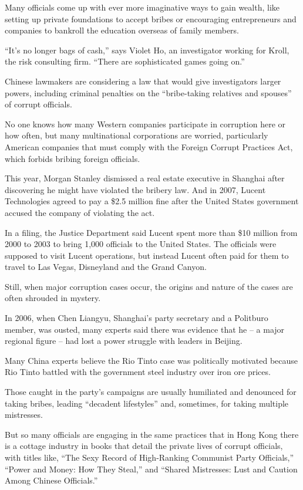 ﻿\documentclass[12pt]{article}
\begin{document}
Many officials come up with ever more imaginative ways to gain wealth, like setting up private
foundations to accept bribes or encouraging entrepreneurs and companies to bankroll the education
overseas of family members.

``It's no longer bags of cash,'' says Violet Ho, an investigator working for Kroll, the risk
consulting firm. ``There are sophisticated games going on.''

Chinese lawmakers are considering a law that would give investigators larger powers, including
criminal penalties on the ``bribe-taking relatives and spouses'' of corrupt officials.

No one knows how many Western companies participate in corruption here or how often, but many
multinational corporations are worried, particularly American companies that must comply with the
Foreign Corrupt Practices Act, which forbids bribing foreign officials.

This year, Morgan Stanley dismissed a real estate executive in Shanghai after discovering he might
have violated the bribery law. And in 2007, Lucent Technologies agreed to pay a \$2.5 million fine
after the United States government accused the company of violating the act.

In a filing, the Justice Department said Lucent spent more than \$10 million from 2000 to 2003 to
bring 1,000 officials to the United States. The officials were supposed to visit Lucent operations,
but instead Lucent often paid for them to travel to Las Vegas, Disneyland and the Grand Canyon.

Still, when major corruption cases occur, the origins and nature of the cases are often shrouded in
mystery.

In 2006, when Chen Liangyu, Shanghai's party secretary and a Politburo member, was ousted, many
experts said there was evidence that he -- a major regional figure -- had lost a power struggle with
leaders in Beijing.

Many China experts believe the Rio Tinto case was politically motivated because Rio Tinto battled
with the government steel industry over iron ore prices.

Those caught in the party's campaigns are usually humiliated and denounced for taking bribes,
leading ``decadent lifestyles'' and, sometimes, for taking multiple mistresses.

But so many officials are engaging in the same practices that in Hong Kong there is a cottage
industry in books that detail the private lives of corrupt officials, with titles like, ``The Sexy
Record of High-Ranking Communist Party Officials,'' ``Power and Money: How They Steal,'' and
``Shared Mistresses: Lust and Caution Among Chinese Officials.''
\end{document}
